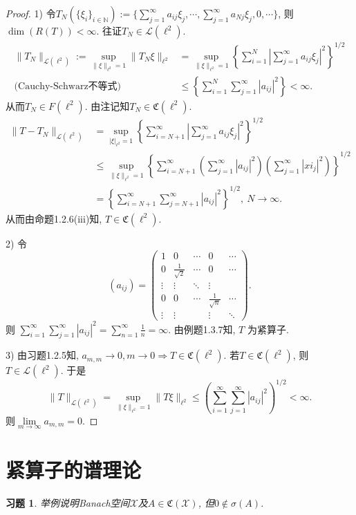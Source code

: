 \documentclass[UTF8,twoside]{ctexbook}
\newtheorem{exercise}{习题}[section]
\newcommand{\h}{\mathscr}
\newcommand{\kx}{\mathbb}
\numberwithin{equation}{section}
\begin{document}
	\begin{proof}
		1) 令$T_N(\{\xi_i\}_{i\in\kx N}):=\{\sum_{j=1}^{\infty}a_{ij}\xi_j,\cdots,\sum_{j=1}^{\infty}a_{Nj}\xi_j,0,\cdots\}$, 则$\dim(R(T))<\infty$. 往证$T_N\in\h L(\ell^2)$.
		\[
		\begin{aligned}
		\|T_N\|_{\h L(\ell^2)}:=\sup_{\|\xi\|_{\ell^2}=1}\|T_N\xi\|_{\ell^2}
		&=\sup_{\|\xi\|_{\ell^2}=1}\left\{\sum_{i=1}^N|\sum_{j=1}^\infty a_{ij}\xi_j|^2\right\}^{1/2}\\
		\text{(Cauchy-Schwarz不等式)}&\leq\left\{\sum_{i=1}^N\sum_{j=1}^\infty |a_{ij}|^2\right\}<\infty.
		\end{aligned}
		\]
		从而$T_N\in F(\ell^2)$. 由注记知$T_N\in\mathfrak C(\ell^2)$.
		\[
		\begin{aligned}
		\|T-T_N\|_{\h L(\ell^2)}
		&=\sup_{|\xi|_{\ell^2}=1}\left\{\sum_{i=N+1}^{\infty}|\sum_{j=1}^{\infty}a_{ij}\xi_j|^2\right\}^{1/2}\\
		&\leq\sup_{\|\xi\|_{\ell^2}=1}\left\{\sum_{i=N+1}^{\infty}(\sum_{j=1}^{\infty}|a_{ij}|^2)(\sum_{j=1}^{\infty}|xi_j|^2)\right\}^{1/2}\\
		&=\left\{\sum_{i=N+1}^{\infty}\sum_{j=N+1}^\infty|a_{ij}|^2\right\}^{1/2},\ N\rightarrow\infty.
		\end{aligned}
		\]
		从而由命题1.2.6(iii)知, $T\in\mathfrak C(\ell^2)$.

		2) 令
		\[
		(a_{ij})=\left(
		\begin{matrix}
		1 & 0 & \cdots & 0 & \cdots\\
		0 & \frac{1}{\sqrt 2} & \cdots & 0 & \cdots \\
		\vdots & \vdots &\ddots & \vdots &  \\
		0 & 0 & \cdots & \frac{1}{\sqrt n} & \cdots \\
		\vdots & \vdots & & \vdots & \ddots
		\end{matrix}
		\right).
		\]
		则 $\sum_{i=1}^\infty\sum_{j=1}^\infty|a_{ij}|^2=\sum_{n=1}^\infty\frac{1}{n}=\infty$. 由例题1.3.7知, $T$ 为紧算子.

		3) 由习题1.2.5知, $a_{m,m}\rightarrow 0 ,m\rightarrow 0 \Longrightarrow T\in\mathfrak C(\ell^2)$. 若$T\in \mathfrak C(\ell^2)$, 则$T\in\h L(\ell^2)$. 于是
		\[
		\|T\|_{\h L(\ell^2)}=\sup_{\|\xi\|_{\ell^2}=1}\|T\xi\|_{\ell^2}\leq
		\left(\sum_{i=1}^{\infty}\sum_{j=1}^{\infty}|a_{ij}|^2\right)^{1/2}<\infty.
		\]
		则$\lim\limits_{m\rightarrow\infty}a_{m,m}=0$.
	\end{proof}
	\section{紧算子的谱理论}
	\begin{exercise}
		举例说明Banach空间$\h X$及$A\in\mathfrak C(\h X)$, 但$0\notin\sigma(A)$.
	\end{exercise}
\end{document}
